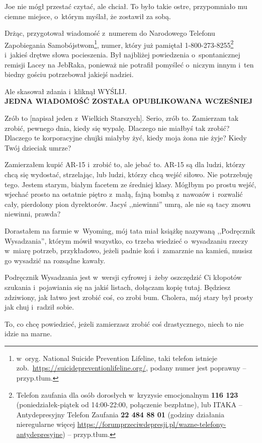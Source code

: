 \documentclass[oneside,polish,11pt,sfheadings]{mwbk}
\begin{document}
Joe nie mógł przestać czytać, ale chciał. To było takie ostre,
przypomniało mu ciemne miejsce, o~którym myślał, że zostawił za sobą.

Drżąc, przygotował wiadomość z~numerem do Narodowego Telefonu
Zapobiegania Samobójstwom\footnote{ w~oryg. National Suicide Prevention
Lifeline, taki telefon istnieje
zob.~\url{https://suicidepreventionlifeline.org/}, podany
numer jest poprawny -- przyp.tłum.}, numer, który już pamiętał
1-800-273-8255\footnote{ Telefon zaufania dla osób dorosłych w~kryzysie
emocjonalnym \textbf{116 123} (poniedziałek-piątek od 14:00-22:00, połączenie
bezpłatne), lub ITAKA -- Antydepresyjny Telefon Zaufania \textbf{22 484 88 01}
(godziny działania nieregularne więcej
\url{https://forumprzeciwdepresji.pl/wazne-telefony-antydepresyjne}) -- przyp.tłum.} i~jakieś drętwe słowa pocieszenia. Był najbliżej
powiedzenia o~spontanicznej remisji Lacey na JebRaka, ponieważ nie
potrafił pomyśleć o~niczym innym i~ten biedny gościu potrzebował jakiejś
nadziei.

Ale skasował zdania i~kliknął WYŚLIJ.\\ \textbf{ JEDNA WIADOMOŚĆ ZOSTAŁA OPUBLIKOWANA WCZEŚNIEJ}

Zrób to {[}napisał jeden z~Wielkich Starszych{]}. Serio, zrób
to. Zamierzam tak zrobić, pewnego dnia, kiedy się wypalę. Dlaczego nie
miałbyś tak zrobić? Dlaczego te korporacyjne chujki miałyby żyć, kiedy
moja żona nie żyje? Kiedy Twój dzieciak umrze?

Zamierzałem kupić AR-15 i~zrobić to, ale jebać to. AR-15 są dla ludzi,
którzy chcą się wydostać, strzelając, lub ludzi, którzy chcą wejść
siłowo. Nie potrzebuję tego. Jestem starym, białym facetem ze średniej
klasy. Mógłbym po prostu wejść, wjechać prosto na ostatnie piętro z~małą, fajną bombą z~nawozów i~rozwalić cały, pierdolony pion dyrektorów.
Jacyś ,,niewinni'' umrą, ale nie są tacy znowu niewinni, prawda?

Dorastałem na farmie w~Wyoming, mój tata miał książkę nazywaną
,,Podręcznik Wysadzania'', którym mówił wszystko, co trzeba wiedzieć o~wysadzaniu rzeczy w~miarę potrzeb, przykładowo, jeżeli padnie koń i~zamarznie na kamień, musisz go wysadzić na rozsądne kawały.

Podręcznik Wysadzania jest w~wersji cyfrowej i~żeby oszczędzić Ci
kłopotów szukania i~pojawiania się na jakiś listach, dołączam kopię
tutaj. Będziesz zdziwiony, jak łatwo jest zrobić coś, co zrobi bum.
Cholera, mój stary był prosty jak chuj i~radził sobie.

To, co chcę powiedzieć, jeżeli zamierzasz zrobić coś drastycznego, niech
to nie idzie na marne.
\end{document}
